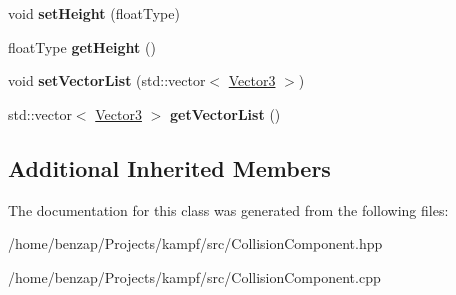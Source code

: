 \begin{DoxyCompactItemize}
\item 
\hypertarget{classCollisionComponent_a692fb3efd37412a6bc5c475110573a86}{void {\bfseries set\-Height} (float\-Type)}\label{classCollisionComponent_a692fb3efd37412a6bc5c475110573a86}

\item 
\hypertarget{classCollisionComponent_a09b5e296cbeed9767d2d64841baf4cf9}{float\-Type {\bfseries get\-Height} ()}\label{classCollisionComponent_a09b5e296cbeed9767d2d64841baf4cf9}

\item 
\hypertarget{classCollisionComponent_a7a047366c7ffc210ad5f3817c968eb32}{void {\bfseries set\-Vector\-List} (std\-::vector$<$ \hyperlink{classVector3}{Vector3} $>$)}\label{classCollisionComponent_a7a047366c7ffc210ad5f3817c968eb32}

\item 
\hypertarget{classCollisionComponent_aa7a6f411851258bfc0775369cfca685b}{std\-::vector$<$ \hyperlink{classVector3}{Vector3} $>$ {\bfseries get\-Vector\-List} ()}\label{classCollisionComponent_aa7a6f411851258bfc0775369cfca685b}

\end{DoxyCompactItemize}
\subsection*{Additional Inherited Members}


The documentation for this class was generated from the following files\-:\begin{DoxyCompactItemize}
\item 
/home/benzap/\-Projects/kampf/src/Collision\-Component.\-hpp\item 
/home/benzap/\-Projects/kampf/src/Collision\-Component.\-cpp\end{DoxyCompactItemize}
